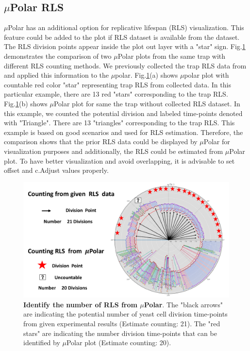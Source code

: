 \documentclass[conference]{IEEEtran}
\begin{document}
\subsection{$\mu$Polar RLS}

$\mu$Polar has an additional option for replicative lifespan (RLS) visualization. This feature could be added to the plot if RLS dataset is available from the dataset. The RLS division points appear inside the plot out layer with a "star" sign. Fig.\ref{fig:rls} demonstrates the comparison of two $\mu$Polar plots from the same trap with different RLS counting methods. We previously collected the trap RLS data from \cite{ref02.2} and applied this information to the $\mu$polar. Fig.\ref{fig:rls}(a) shows $\mu$polar plot with countable red color "star" representing trap RLS from collected data. In this particular example, there are 13 red "stars" corresponding to the trap RLS. Fig.\ref{fig:rls}(b) shows $\mu$Polar plot for same the trap without collected RLS dataset. In this example, we counted the potential division and labeled time-points denoted with "Triangle". There are 13 "triangles" corresponding to the trap RLS. This example is based on good scenarios and used for RLS estimation. Therefore, the comparison shows that the prior RLS data could be displayed by $\mu$Polar for visualization purposes and additionally, the RLS could be estimated from $\mu$Polar plot. To have better visualization and avoid overlapping, it is advisable to set offset and c.Adjust values properly.       

\begin{figure}
\centering
\includegraphics[width=\textwidth,height=10 cm]{Patterns/rlsTp1.pdf}
\caption{ \textbf{Identify the number of RLS from $\mu$Polar}. The "black arrows" are indicating the potential number of yeast cell division time-points from given experimental results (Estimate counting: 21). The "red stars" are indicating the number division time-points that can be identified by $\mu$Polar plot (Estimate counting: 20).}
\label{fig:rls}
\end{figure}
\end{document}
